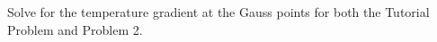 Solve for the temperature gradient at the Gauss points for both the Tutorial Problem and Problem 2.


